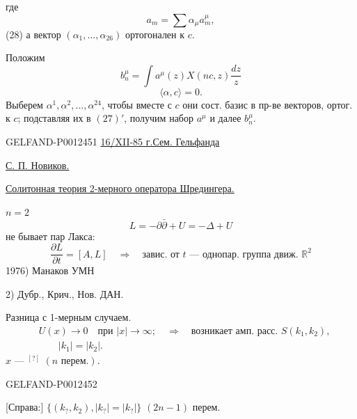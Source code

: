 где
\begin{equation*}
a_m=\sum\alpha_\mu a_m^\mu,\tag*{$(27)'$}
\end{equation*}
(28) а вектор $(\alpha_1,\ldots,\alpha_{26})$ ортогонален к $c$.

Положим
\begin{equation*}
b_n^\mu=\int a^\mu(z)X(nc,z)\frac{dz}{z}\tag{29}
\end{equation*}
\begin{equation*}
\langle\alpha,c\rangle=0.\tag{30}
\end{equation*}
Выберем $\alpha^1,\alpha^2,\ldots,\alpha^{24}$, чтобы вместе с $c$ они сост. базис в пр-ве векторов, ортог. к $c$; подставляя их в $(27)'$, получим набор $a^\mu$ и далее $b_n^\mu$.


\begin{GelfandAdjacentEvidence}{GELFAND-P001245}{1}
\underline{16/XII-85 г.}\qquad \underline{Сем. Гельфанда}

\underline{С. П. Новиков.}

\underline{Солитонная теория 2-мерного оператора Шредингера.}

\underline{$n=2$}
\begin{equation*}
L=-\partial\bar\partial+U=-\Delta+U\tag{1}
\end{equation*}
не бывает пар Лакса:
\begin{equation*}
\frac{\partial L}{\partial t}=[A,L]
\quad\Rightarrow\quad
\text{завис. от }t\text{ — однопар. группа движ. }\mathbb R^2\tag{2}
\end{equation*}
1976) Манаков УМН

\hspace{2em}2) Дубр., Крич., Нов. ДАН.

Разница с 1-мерным случаем.
\begin{equation*}
\begin{aligned}
&U(x)\to0\quad\text{при }|x|\to\infty;\quad\Rightarrow\quad\text{возникает амп. расс. }S(k_1,k_2),\\
&\hspace{2em}|k_1|=|k_2|.
\end{aligned}\tag{3}
\end{equation*}
$x$ — $^{[\text{?}]}$ $(n\text{ перем.})$.
\end{GelfandAdjacentEvidence}
\begin{GelfandAdjacentEvidence}{GELFAND-P001245}{2}


[Справа:] $\{(k_{?},k_2),\lvert k_{?}\rvert=\lvert k_{?}\rvert\}$ $(2n-1)$ перем.
\end{GelfandAdjacentEvidence}
